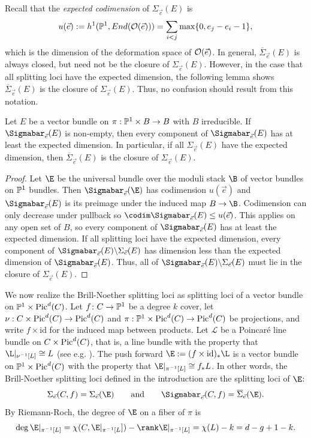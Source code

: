 Recall that the \textit{expected codimension} of $\Sigma_{\vec{e}}(E)$ is
\[u(\vec{e}) := h^1(\mathbb{P}^1, End(\mathcal{O}(\vec{e}))) = \sum_{i < j} \max \{0, e_j - e_i - 1\},\]
which is the dimension of the deformation space of $\mathcal{O}(\vec{e})$.
In general, $\overline{\Sigma}_{\vec{e}}(E)$ is always closed, but need not be the closure of $\Sigma_{\vec{e}}(E)$.
However, in the case that all splitting loci have the expected dimension, the following lemma shows $\overline{\Sigma}_{\vec{e}}(E)$ is the closure of $\Sigma_{\vec{e}}(E)$. Thus, no confusion should result from this notation.
\begin{Lemma}
\notready \label{low}
Let $E$ be a vector bundle on $\pi: \mathbb{P}^1 \times B \rightarrow B$ with $B$ irreducible. If $\Sigmabar_{\vec{e}}(E)$ is non-empty, then every component of $\Sigmabar_{\vec{e}}(E)$ has at least the expected dimension. In particular, if all $\Sigma_{\vec{e}}(E)$ have the expected dimension, then $\overline{\Sigma}_{\vec{e}}(E)$ is the closure of $\Sigma_{\vec{e}}(E)$.
\end{Lemma}
\begin{proof}
Let $\E$ be the universal bundle over the moduli stack $\B$ of vector bundles on $\mathbb{P}^1$ bundles. Then $\Sigmabar_{\vec{e}}(\E)$ has codimension $u(\vec{e})$ and
$\Sigmabar_{\vec{e}}(E)$ is its preimage under the induced map $B \rightarrow \B$. Codimension can only decrease under pullback so $\codim \Sigmabar_{\vec{e}}(E) \leq u(\vec{e})$. This applies on any open set of $B$, so every component of $\Sigmabar_{\vec{e}}(E)$ has at least the expected dimension.
If all splitting loci have the expected dimension, every component of $\Sigmabar_{\vec{e}}(E) \backslash \Sigma_{\vec{e}}(E)$ has dimension less than the expected dimension of $\Sigmabar_{\vec{e}}(E)$. Thus, all of $\Sigmabar_{\vec{e}}(E) \backslash \Sigma_{\vec{e}}(E)$ must lie in the closure of $ \Sigma_{\vec{e}}(E)$.
\end{proof}

We now realize the Brill-Noether splitting loci as splitting loci of a vector
bundle on $\mathbb{P}^1 \times \operatorname{Pic}^d(C)$. Let $f\colon C \to \mathbb{P}^1$ be a degree
$k$ cover, let $\nu:C\times\operatorname{Pic}^d(C)\to\operatorname{Pic}^d(C)$ and
$\pi:\mathbb{P}^1\times\operatorname{Pic}^d(C)\to\operatorname{Pic}^d(C)$ be projections, and write
$f\times\mathrm{id}$ for the induced map between products.
Let $\mathcal{L}$ be a Poincar\'e line bundle on $C \times \operatorname{Pic}^d(C)$, that is, a line bundle with the property that $\L|_{\nu^{-1}[L]} \cong L$ (see e.g. \cite[\S IV.2]{ACGH}).
The push forward $\E := (f \times \mathrm{id})_*\L$ is a vector bundle on $\mathbb{P}^1 \times \operatorname{Pic}^d(C)$ with the property that $\E|_{\pi^{-1}[L]} \cong f_*L$.
In other words, the Brill-Noether splitting loci defined in the introduction are the splitting loci of $\E$:
\[\Sigma_{\vec{e}}(C, f) = \Sigma_{\vec{e}}(\E) \qquad \text{and} \qquad \Sigmabar_{\vec{e}}(C, f) = \overline{\Sigma}_{\vec{e}}(\E).\]
 By Riemann-Roch, the degree of $\E$ on a fiber of $\pi$ is
\[
\deg \E|_{\pi^{-1}[L]} = \chi(C, \E|_{\pi^{-1}[L}]) - \rank \E|_{\pi^{-1}[L]} = \chi(L) - k = d - g + 1 - k.
\]

